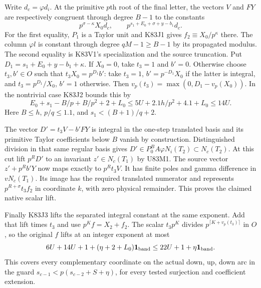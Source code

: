 Write $d_c=\varphi d_i$. At the primitive $p$th root of the
final letter, the vectors $V$ and $FY$ are respectively congruent
through degree $B-1$ to the constants
\[
     p^{\sigma-\kappa}X_0d_c,\qquad
     p^{s_1+E_0+\sigma+y-b_1}d_c .
\]
For the first equality, $P_1$ is a Taylor unit and K83J1 gives
$f_2\equiv X_0/p^\kappa$ there. The column $\varphi l$ is
constant through degree $qM-1\ge B-1$ by its propagated modulus.
The second equality is K83V1's specialization and the source
truncation. Put $D_1=s_1+E_0+y-b_1+\kappa$. If $X_0=0$, take
$t_3=1$ and $b'=0$. Otherwise choose $t_3,b'\in O$ such that
$t_3X_0=p^{D_1}b'$: take $t_3=1$, $b'=p^{-D_1}X_0$ if the
latter is integral, and $t_3=p^{D_1}/X_0$, $b'=1$ otherwise.
Then $v_p(t_3)=\max(0,D_1-v_p(X_0))$. In the nontrivial case
K83J2 bounds this by
\[
 E_0+s_1-B/p+B/p^2+2+L_0
 \le 5U+2.1h/p^2+4.1+L_0\le14U .
\]
Here $B\le h$, $p/q\le1.1$, and
$s_1<(B+1)/q+2$.

The vector $D'=t_3V-b'FY$ is integral in the one-step translated
basis and its primitive Taylor coefficients below $B$ vanish
by construction. Distinguished division in that same regular
basis gives $D'\in P_0^B A\varphi N_i(T_2)\subset N_c(T_2)$.
At this cut lift $p^RD'$ to an invariant $z'\in N_c(T_1)$
by U83M1. The source vector $z'+p^R b'Y$ now maps exactly to
$p^R t_3 V$. It has finite poles and gamma difference in
$vN_c(T_1)$. Its image has the required translated numerator and
represents $p^{R+\sigma}t_3f_2$ in coordinate $k$, with zero
physical remainder. This proves the claimed native scalar lift.

Finally K83J3 lifts the separated integral constant at the same
exponent. Add that lift times $t_3$ and use
$p^Kf=X_2+f_2$. The scalar $t_3p^K$ divides
$p^{\lceil K+v_p(t_3)\rceil}$ in $O$, so the original $f$
lifts at an integer exponent at most
\[
 6U+14U+1+(\eta+2+L_0)\mathbf1_{\rm band}
       \le22U+1+\eta\mathbf1_{\rm band}.
\]
This covers every complementary coordinate on the actual
down, up, down arc in the guard $s_{c-1}<p(s_{c-2}+S+\eta)$,
for every tested surjection and coefficient extension.
